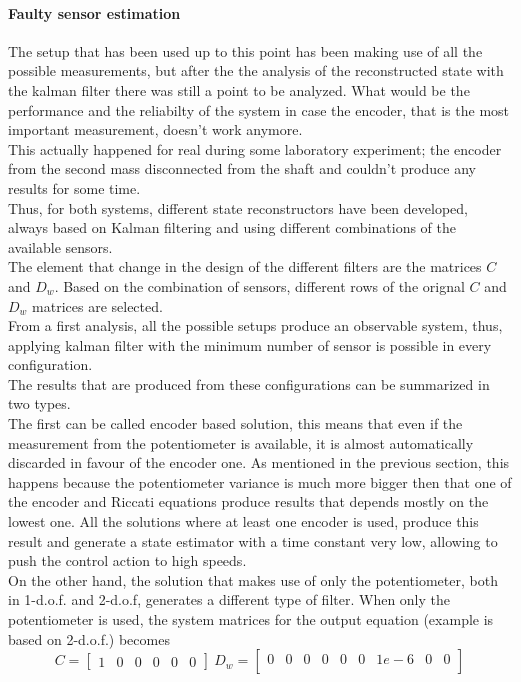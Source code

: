 \paragraph{Faulty sensor estimation}
The setup that has been used up to this point has been making use of all  the possible measurements, but after the the analysis of the reconstructed state with the kalman filter there was still a point to be analyzed. What would be the performance and the reliabilty of the system in case the encoder, that is the most important measurement, doesn't work anymore. \\
This actually happened for real during some laboratory experiment; the encoder from the second mass disconnected from the shaft and couldn't produce any results for some time. \\ 
Thus, for both systems, different state reconstructors have been developed, always based on Kalman filtering and using different combinations of the available sensors. \\
The element that change in the design of the different filters are the matrices $C$ and $D_w$. Based on the combination of sensors, different rows of the orignal $C$ and $D_w$ matrices are selected. \\
From a first analysis, all the possible setups produce an observable system, thus, applying kalman filter with the minimum number of sensor is possible in every configuration. \\
The results that are produced from these configurations can be summarized in two types. \\ 
The first can be called encoder based solution, this means that even if the measurement from the potentiometer is available, it is almost automatically discarded in favour of the encoder one. As mentioned in the previous section, this happens because the potentiometer variance is much more bigger then that one of the encoder and Riccati equations produce results that depends mostly on the lowest one. All the solutions where at least one encoder is used, produce this result and generate a state estimator with a time constant very low, allowing to push the control action to high speeds.\\
On the other hand, the solution that makes use of only the potentiometer, both in 1-d.o.f. and 2-d.o.f, generates a different type of filter. When only the potentiometer is used, the system matrices for the output equation (example is based on 2-d.o.f.) becomes 
\begin{equation}
	C = \begin{bmatrix}
		1 & 0 & 0 & 0 & 0 & 0
	\end{bmatrix} \
	D_w = \begin{bmatrix}
		0 & 0 & 0 & 0 & 0 & 0 & 1e-6 & 0 & 0 \\
	\end{bmatrix} 
\end{equation}
